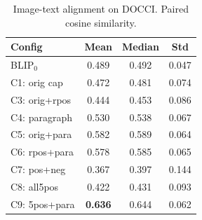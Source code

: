 \begin{table}[t]
\centering
\caption{Image-text alignment on DOCCI. Paired cosine similarity.}
\label{tab:align_docci}
\small
\begin{tabular}{lccc}
\toprule
\textbf{Config} & \textbf{Mean} & \textbf{Median} & \textbf{Std} \\
\midrule
BLIP$_0$ & 0.489 & 0.492 & 0.047 \\
\midrule
C1: orig cap & 0.472 & 0.481 & 0.074 \\
C3: orig+rpos & 0.444 & 0.453 & 0.086 \\
C4: paragraph & 0.530 & 0.538 & 0.067 \\
C5: orig+para & 0.582 & 0.589 & 0.064 \\
C6: rpos+para & 0.578 & 0.585 & 0.065 \\
C7: pos+neg & 0.367 & 0.397 & 0.144 \\
C8: all5pos & 0.422 & 0.431 & 0.093 \\
C9: 5pos+para & \textbf{0.636} & 0.644 & 0.062 \\
\bottomrule
\end{tabular}
\end{table}
